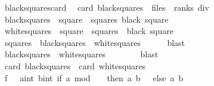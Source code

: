 \begin{isabellebody}
\endisatagproof
{\isafoldproof}%
%
\isadelimproof
\isanewline
%
\endisadelimproof
\isanewline
{}\isamarkupfalse%
\ black{\isacharunderscore}squares{\isacharunderscore}card{\isacharcolon}\isanewline
\ \ {\isachardoublequoteopen}card\ black{\isacharunderscore}squares\ {\isacharequal}\ {\isacharparenleft}files\ {\isacharasterisk}\ ranks{\isacharparenright}\ div\ {}{\isachardoublequoteclose}\isanewline
%
\isadelimproof
%
\endisadelimproof
%
\isatagproof
{}\isamarkupfalse%
{\isacharminus}\isanewline
\ \ \isamarkupfalse%
\ {\isacharquery}black{\isacharunderscore}squares\ {\isacharequal}\ {\isachardoublequoteopen}{\isacharbraceleft}square\ {\isasymin}\ squares{\isachardot}\ black\ square{\isacharbraceright}{\isachardoublequoteclose}\isanewline
\ \ \isamarkupfalse%
\ {\isacharquery}white{\isacharunderscore}squares\ {\isacharequal}\ {\isachardoublequoteopen}{\isacharbraceleft}square\ {\isasymin}\ squares{\isachardot}\ {\isasymnot}\ black\ square{\isacharbraceright}{\isachardoublequoteclose}\isanewline
\ \ \isamarkupfalse%
\ {\isachardoublequoteopen}squares\ {\isacharequal}\ {\isacharquery}black{\isacharunderscore}squares\ {\isasymunion}\ {\isacharquery}white{\isacharunderscore}squares{\isachardoublequoteclose}\isanewline
\ \ \ \ \isamarkupfalse%
\ blast\isanewline
\ \ \isamarkupfalse%
\isanewline
\ \ \isamarkupfalse%
\ {\isachardoublequoteopen}{\isacharquery}black{\isacharunderscore}squares\ {\isasyminter}\ {\isacharquery}white{\isacharunderscore}squares\ {\isacharequal}\ {\isacharbraceleft}{\isacharbraceright}{\isachardoublequoteclose}\isanewline
\ \ \ \ \isamarkupfalse%
\ blast\isanewline
\ \ \isamarkupfalse%
\isanewline
\ \ \isamarkupfalse%
\ {\isachardoublequoteopen}card\ {\isacharquery}black{\isacharunderscore}squares\ {\isacharequal}\ card\ {\isacharquery}white{\isacharunderscore}squares{\isachardoublequoteclose}\isanewline
\ \ \isamarkupfalse%
{\isacharminus}\isanewline
\ \ \ \ \isamarkupfalse%
\ {\isacharquery}f\ {\isacharequal}\ {\isachardoublequoteopen}{\isasymlambda}\ {\isacharparenleft}a{\isacharcolon}{\isacharcolon}int{\isacharcomma}\ b{\isacharcolon}{\isacharcolon}int{\isacharparenright}{\isachardot}\ if\ a\ mod\ {}\ {\isacharequal}\ {}\ then\ {\isacharparenleft}a{\isacharcomma}\ b\ {\isacharplus}\ {}{\isacharparenright}\ else\ {\isacharparenleft}a{\isacharcomma}\ b\ {\isacharminus}\ {}{\isacharparenright}{\isachardoublequoteclose}\isanewline

\end{isabellebody}

